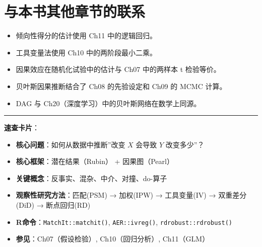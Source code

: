 \documentclass[
]{book}
\providecommand{\tightlist}{%
  \setlength{\itemsep}{0pt}\setlength{\parskip}{0pt}}
\begin{document}
\section{与本书其他章节的联系}\label{ux4e0eux672cux4e66ux5176ux4ed6ux7ae0ux8282ux7684ux8054ux7cfb-2}

\begin{itemize}
\tightlist
\item
  倾向性得分的估计使用 Ch11 中的逻辑回归。
\item
  工具变量法使用 Ch10 中的两阶段最小二乘。
\item
  因果效应在随机化试验中的估计与 Ch07 中的两样本 t 检验等价。
\item
  贝叶斯因果推断结合了 Ch08 的先验设定和 Ch09 的 MCMC 计算。
\item
  DAG 与 Ch20（深度学习）中的贝叶斯网络在数学上同源。
\end{itemize}

\begin{center}\rule{0.5\linewidth}{0.5pt}\end{center}

\textbf{速查卡片}：

\begin{itemize}
\tightlist
\item
  \textbf{核心问题}：如何从数据中推断''改变 \(X\) 会导致 \(Y\) 改变多少''？
\item
  \textbf{核心框架}：潜在结果（Rubin） + 因果图（Pearl）
\item
  \textbf{关键概念}：反事实、混杂、中介、对撞、do-算子
\item
  \textbf{观察性研究方法}：匹配(PSM) → 加权(IPW) → 工具变量(IV) → 双重差分(DiD) → 断点回归(RD)
\item
  \textbf{R命令}：\texttt{MatchIt::matchit()}, \texttt{AER::ivreg()}, \texttt{rdrobust::rdrobust()}
\item
  \textbf{参见}：Ch07（假设检验）, Ch10（回归分析）, Ch11（GLM）
\end{itemize}
\end{document}
